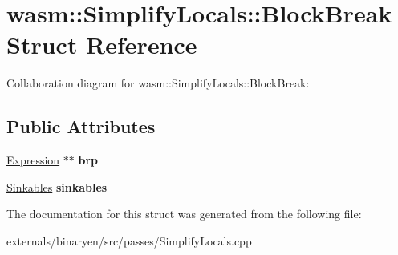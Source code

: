 \hypertarget{structwasm_1_1_simplify_locals_1_1_block_break}{}\section{wasm\+:\+:Simplify\+Locals\+:\+:Block\+Break Struct Reference}
\label{structwasm_1_1_simplify_locals_1_1_block_break}


Collaboration diagram for wasm\+:\+:Simplify\+Locals\+:\+:Block\+Break\+:
\subsection*{Public Attributes}
\begin{DoxyCompactItemize}
\item 
\mbox{\label{structwasm_1_1_simplify_locals_1_1_block_break_a6f5c1fa620503c9082036440a815d8da}} 
\mbox{\hyperlink{classwasm_1_1_expression}{Expression}} $\ast$$\ast$ {\bfseries brp}
\item 
\mbox{\label{structwasm_1_1_simplify_locals_1_1_block_break_a0520913eaf3503ff3e52cc93b9fc6143}} 
\mbox{\hyperlink{classstd_1_1map}{Sinkables}} {\bfseries sinkables}
\end{DoxyCompactItemize}


The documentation for this struct was generated from the following file\+:\begin{DoxyCompactItemize}
\item 
externals/binaryen/src/passes/Simplify\+Locals.\+cpp\end{DoxyCompactItemize}
